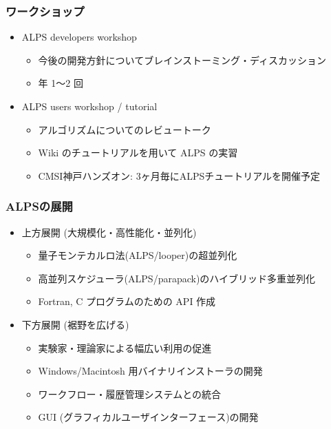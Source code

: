\begin{frame}
  \frametitle{ワークショップ}
  \begin{itemize}
    \setlength{\itemsep}{1em}
  \item ALPS developers workshop
    \begin{itemize}
      \item 今後の開発方針についてブレインストーミング・ディスカッション
      \item 年 1〜2 回
    \end{itemize}
  \item ALPS users workshop / tutorial
    \begin{itemize}
      \item アルゴリズムについてのレビュートーク
      \item Wiki のチュートリアルを用いて ALPS の実習
      \item CMSI神戸ハンズオン: 3ヶ月毎にALPSチュートリアルを開催予定
    \end{itemize}
  \end{itemize}
\end{frame}

\begin{frame}
  \frametitle{ALPSの展開}
  \begin{itemize}
    \setlength{\itemsep}{1em}
  \item 上方展開 (大規模化・高性能化・並列化)
    \begin{itemize}
    \item 量子モンテカルロ法(ALPS/looper)の超並列化
    \item 高並列スケジューラ(ALPS/parapack)のハイブリッド多重並列化
    \item Fortran, C プログラムのための API 作成
    \end{itemize}
  \item 下方展開 (裾野を広げる)
    \begin{itemize}
    \item 実験家・理論家による幅広い利用の促進
    \item Windows/Macintosh 用バイナリインストーラの開発
    \item ワークフロー・履歴管理システムとの統合
    \item GUI (グラフィカルユーザインターフェース)の開発
    \end{itemize}
  \end{itemize}
\end{frame}

